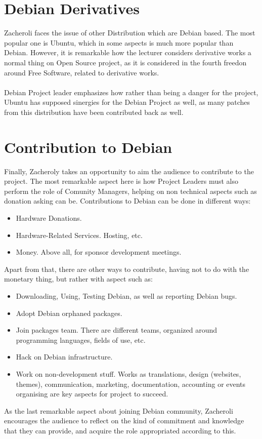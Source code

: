 \documentclass[11pt]{article}
\begin{document}
\section{Debian Derivatives}
Zacheroli faces the issue of other Distribution which are Debian based. The most popular one is Ubuntu, which in some aspects is much more popular than Debian. However, it is remarkable how the lecturer considers derivative works a normal thing on Open Source project, as it is considered in the fourth freedon around Free Software, related to derivative works.\\
\\
Debian Project leader emphasizes how rather than being a danger for the project, Ubuntu has supposed sinergies for the Debian Project as well, as many patches from this distribution have been contributed back as well.

\section{Contribution to Debian}
Finally, Zacheroly takes an opportunity to aim the audience to contribute to the project. The most remarkable aspect here is how Project Leaders must also perform the role of Comunity Managers, helping on non technical aspects such as donation asking can be. Contributions to Debian can be done in different ways:
\begin{itemize}\itemsep0pt
\item{Hardware Donations}. 
\item{Hardware-Related Services}. Hosting, etc.
\item{Money}. Above all, for sponsor development meetings.
\end{itemize}
Apart from that, there are other ways to contribute, having not to do with the monetary thing, but rather with aspect such as:
\begin{itemize}\itemsep0pt
\item{Downloading, Using, Testing Debian, as well as reporting Debian bugs}. 
\item{Adopt Debian orphaned packages}.
\item{Join packages team}. There are different teams, organized around programming languages, fields of use, etc. 
\item{Hack on Debian infrastructure}.
\item{Work on non-development stuff}.  Works as translations, design (websites, themes), communication, marketing, documentation, accounting or events organising are key aspects for project to succeed.
\end{itemize}
As the last remarkable aspect about joining Debian community, Zacheroli encourages the audience to reflect on the kind of commitment and knowledge that they can provide, and acquire the role appropriated according to this.


{}
\end{document}
